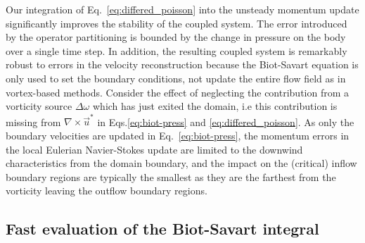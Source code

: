 \documentclass[final,1p,times]{elsarticle}
\begin{document}
Our integration of Eq.~\ref{eq:differed_poisson} into the unsteady momentum update significantly improves the stability of the coupled system. The error introduced by the operator partitioning is bounded by the change in pressure on the body over a single time step. %
In addition, the resulting coupled system is remarkably robust to errors in the velocity reconstruction because the Biot-Savart equation is only used to set the boundary conditions, not update the entire flow field as in vortex-based methods. Consider the effect of neglecting the contribution from a vorticity source $\Delta\omega$ which has just exited the domain, i.e this contribution is missing from $\nabla\times\vec u^*$ in Eqs.\ref{eq:biot-press} and \ref{eq:differed_poisson}. As only the boundary velocities are updated in Eq.~\ref{eq:biot-press}, the momentum errors in the local Eulerian Navier-Stokes update are limited to the downwind characteristics from the domain boundary, and the impact on the (critical) inflow boundary regions are typically the smallest as they are the farthest from the vorticity leaving the outflow boundary regions. 


\subsection{Fast evaluation of the Biot-Savart integral}
\end{document}
